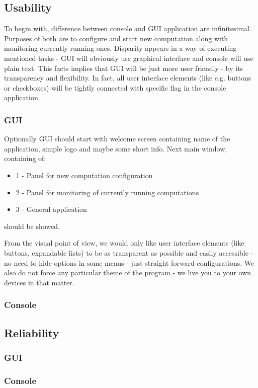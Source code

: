\documentclass{article}
\begin{document}
\subsection{Usability}
To begin with, difference between console and GUI application are infinitesimal. Purposes of both are to configure and start new computation along with monitoring currently running ones.
Disparity appears in a way of executing mentioned tasks - GUI will obviously use graphical interface and console will use plain text. This facts implies that GUI will be just more user friendly - by its transparency and flexibility. In fact, all user interface elements (like e.g. buttons or checkboxes) will be tightly connected with specific flag in the console application.

\subsubsection{GUI}
Optionally GUI should start with welcome screen containing name of the application, simple logo and maybe some short info. Next main window, containing of:
\begin{itemize} 
\item 1 - Panel for new computation configuration
\item 2 - Panel for monitoring of currently running computations
\item 3 - General application 
\end{itemize} 
should be showed. 

From the visual point of view, we would only like user interface elements (like buttons, expandable lists) to be as transparent as possible and easily accessible - no need to hide options in some menus - just straight forward configurations. We also do not force any particular theme of the program - we live you to your own devices in that matter.

\subsubsection{Console}

%
%
\subsection{Reliability}
\subsubsection{GUI}
\subsubsection{Console}
\end{document}
